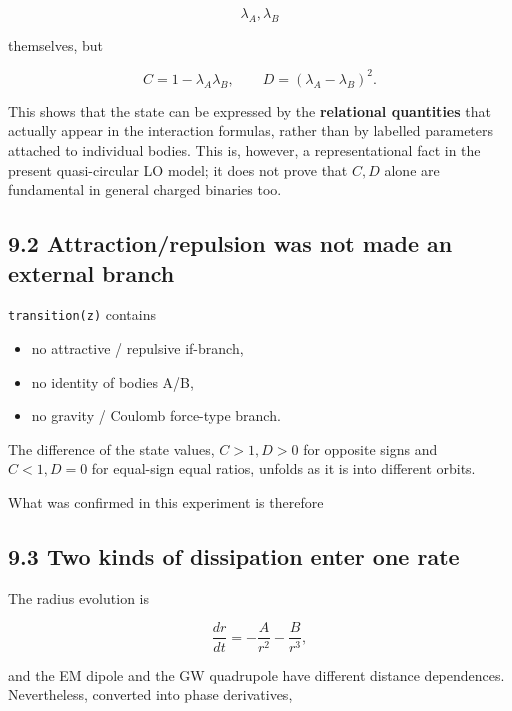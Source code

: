 \documentclass[
  a4paper,
]{article}
\providecommand{\tightlist}{%
  \setlength{\itemsep}{0pt}\setlength{\parskip}{0pt}}
\begin{document}
\[
\lambda_A,
\lambda_B
\]

themselves, but

\[
C=1-\lambda_A\lambda_B,
\qquad
D=(\lambda_A-\lambda_B)^2.
\]

This shows that the state can be expressed by the \textbf{relational
quantities} that actually appear in the interaction formulas, rather
than by labelled parameters attached to individual bodies. This is,
however, a representational fact in the present quasi-circular LO model;
it does not prove that \(C,D\) alone are fundamental in general charged
binaries too.

\subsection{9.2 Attraction/repulsion was not made an external
branch}\label{attractionrepulsion-was-not-made-an-external-branch}

\texttt{transition(z)} contains

\begin{itemize}
\tightlist
\item
  no attractive / repulsive if-branch,
\item
  no identity of bodies A/B,
\item
  no gravity / Coulomb force-type branch.
\end{itemize}

The difference of the state values, \(C>1,D>0\) for opposite signs and
\(C<1,D=0\) for equal-sign equal ratios, unfolds as it is into different
orbits.

What was confirmed in this experiment is therefore

\begin{center}
\end{center}

\subsection{9.3 Two kinds of dissipation enter one
rate}\label{two-kinds-of-dissipation-enter-one-rate}

The radius evolution is

\[
\frac{dr}{dt}
=-\frac{A}{r^2}-\frac{B}{r^3},
\]

and the EM dipole and the GW quadrupole have different distance
dependences. Nevertheless, converted into phase derivatives,
\end{document}
